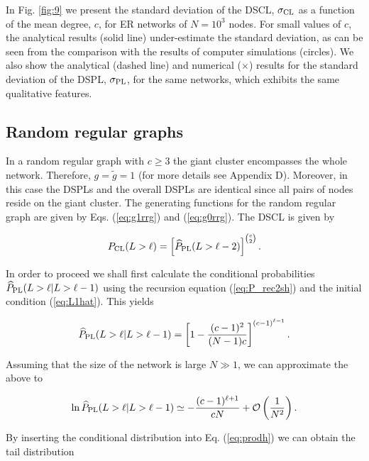 \documentclass[preprint,pre,superscriptaddress,showpacs]{revtex4}
\begin{document}
In Fig. \ref{fig:9} we present
the standard deviation of the DSCL, $\sigma_{\rm CL}$ 
as a function of the mean degree, $c$, for ER networks 
of $N=10^3$ nodes.
For small values of $c$,
the analytical results (solid line) 
under-estimate the standard deviation, as can be seen
from the comparison with
the results of computer simulations (circles).
We also show the
analytical (dashed line) and numerical ($\times$) results for the
standard deviation of the DSPL,
$\sigma_{\rm PL}$, for the same networks,
which exhibits the same qualitative features.





\subsection{Random regular graphs}

In a random regular graph with $c \ge 3$
the giant cluster encompasses the whole network.
Therefore, $g = {\widetilde g}=1$
(for more details see Appendix D).
Moreover, in this case the DSPLs and the overall DSPLs
are identical since all pairs of nodes reside on the
giant cluster. 
The generating functions for the random regular graph are given
by 
Eqs. (\ref{eq:g1rrg}) and (\ref{eq:g0rrg}).
The DSCL is given by

\begin{equation}
P_{\rm CL} (L>\ell)
= 
\left[ \widehat P_{\rm PL} (L>\ell-2) \right]^{\binom{c}{2}}.
\label{eq:DSCLr1}
\end{equation}

\noindent
In order to proceed we shall first calculate the
conditional probabilities 
$\widehat P_{\rm PL}(L>\ell | L>\ell-1)$ 
using 
the recursion equation (\ref{eq:P_rec2sh}) and the initial 
condition (\ref{eq:L1hat}). 
This yields


\begin{equation}
\widehat P_{\rm PL}(L>\ell|L>\ell-1) = \left[ 1-\frac{(c-1)^2}{(N-1)c} \right]^{(c-1)^{\ell-1}}.
\end{equation}

\noindent
Assuming that the size of the network is large $N \gg 1$,
we can approximate the above to

\begin{equation}
\ln \widehat P_{\rm PL}(L>\ell|L>\ell-1) \simeq -\frac{(c-1)^{\ell+1}}{c N} 
+ {\mathcal O} \left(\frac{1}{N^2}  \right).
\end{equation}

\noindent
By inserting the conditional distribution into 
Eq. (\ref{eq:prodh}) we can obtain the tail distribution 
\end{document}
